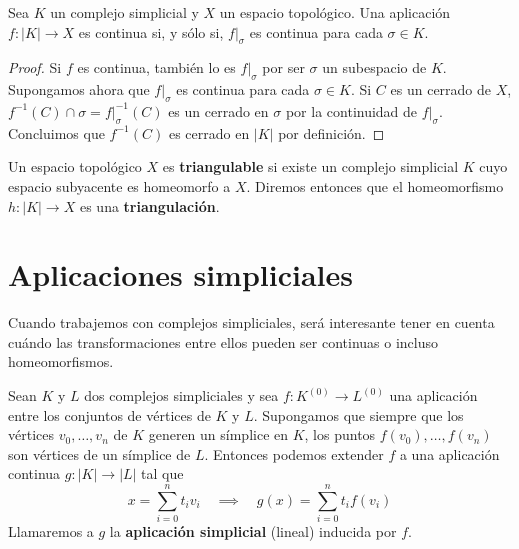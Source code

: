 \begin{lema}
	\label{lem:cont_poly} Sea \(K\) un complejo simplicial y \(X\) un espacio topológico.
	Una aplicación \(f: |K| \rightarrow X\) es continua si, y sólo si, \(f|_{\sigma}\)
	es continua para cada \(\sigma \in K\).
\end{lema}
\begin{proof}
	Si \(f\) es continua, también lo es \(f|_{\sigma}\) por ser \(\sigma\) un subespacio
	de \(K\). Supongamos ahora que \(f|_{\sigma}\) es continua para cada \(\sigma \in K\).
	Si \(C\) es un cerrado de \(X\), \(f^{-1}(C) \cap \sigma = f|_{\sigma}^{-1}(C)\) es un
	cerrado en \(\sigma\) por la continuidad de \(f|_{\sigma}\). Concluimos que
	\(f^{-1}(C)\) es cerrado en \(|K|\) por definición.
\end{proof}
\begin{definicion}
	Un espacio topológico \(X\) es \textbf{triangulable} si existe un complejo
	simplicial \(K\) cuyo espacio subyacente es homeomorfo a \(X\). Diremos entonces que
	el homeomorfismo \(h: |K| \rightarrow X\) es una \textbf{triangulación}.
\end{definicion}

\section{Aplicaciones simpliciales}

Cuando trabajemos con complejos simpliciales, será interesante tener en cuenta cuándo
las transformaciones entre ellos pueden ser continuas o incluso homeomorfismos.

\begin{lema}
	Sean \(K\) y \(L\) dos complejos simpliciales y sea \(f: K^{(0)}\rightarrow L^{(0)}\)
	una aplicación entre los conjuntos de vértices de \(K\) y \(L\). Supongamos que
	siempre que los vértices \(v_{0}, \ldots, v_{n}\) de \(K\) generen un símplice en
	\(K\), los puntos \(f(v_{0}), \ldots, f(v_{n})\) son vértices de un símplice de \(L\).
	Entonces podemos extender \(f\) a una aplicación continua
	\(g:|K| \rightarrow |L|\) tal que
	\[
		x = \sum_{i=0}^{n}t_{i}v_{i}\quad \implies \quad g(x) = \sum_{i=0}^{n}t_{i}f
		(v_{i})
	\]
	Llamaremos a \(g\) la \textbf{aplicación simplicial} (lineal) inducida por \(f\).
\end{lema}

